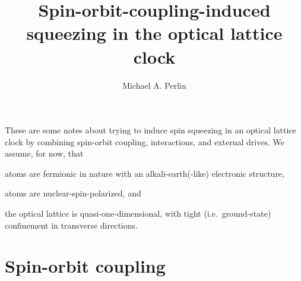 \documentclass[aps,notitlepage,nofootinbib,11pt]{revtex4-1}
\newcommand{\1}{\mathds{1}}
\begin{document}
\title{Spin-orbit-coupling-induced squeezing in the optical lattice
  clock}

\author{Michael A. Perlin}

\maketitle

These are some notes about trying to induce spin squeezing in an
optical lattice clock by combining spin-orbit coupling, interactions,
and external drives.  We assume, for now, that
\begin{enumerate*}[label=(\roman*)]
\item atoms are fermionic in nature with an alkali-earth(-like)
  electronic structure,
\item atoms are nuclear-spin-polarized, and
\item the optical lattice is quasi-one-dimensional, with tight
  (i.e.~ground-state) confinement in transverse directions.
\end{enumerate*}


\section{Spin-orbit coupling}
\end{document}
